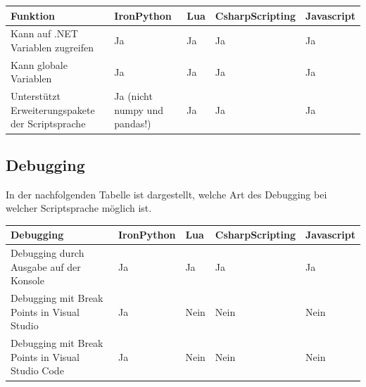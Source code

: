 \begin{table}[H]
    \begin{tabular}{|p{3cm}|p{3cm}|p{3cm}|p{3cm}|p{3cm}|}
        \hline
        Funktion & IronPython & Lua & CsharpScripting & Javascript\\ \hline
        Kann auf .NET Variablen zugreifen & Ja & Ja & Ja & Ja \\ \hline
        Kann globale Variablen & Ja & Ja & Ja & Ja \\ \hline
        Unterstützt Erweiterungspakete der Scriptsprache & Ja (nicht numpy und pandas!) & Ja & Ja & Ja \\ \hline 
    \end{tabular} 
\end{table}
\newpage
\subsection{Debugging}
In der nachfolgenden Tabelle ist dargestellt, welche Art des Debugging bei welcher Scriptsprache möglich ist.

\begin{table}[H]
    \begin{tabular}{|p{2.5cm}|p{2.5cm}|p{2.5cm}|p{2.5cm}|p{2.5cm}|}
        \hline
        Debugging & IronPython & Lua & CsharpScripting & Javascript\\ \hline
        Debugging durch Ausgabe auf der Konsole & Ja & Ja & Ja & Ja \\ \hline
        Debugging mit Break Points in Visual Studio & Ja & Nein & Nein & Nein\\ \hline
        Debugging mit Break Points in Visual Studio Code & Ja & Nein & Nein & Nein \\ \hline
    \end{tabular}
\end{table}
